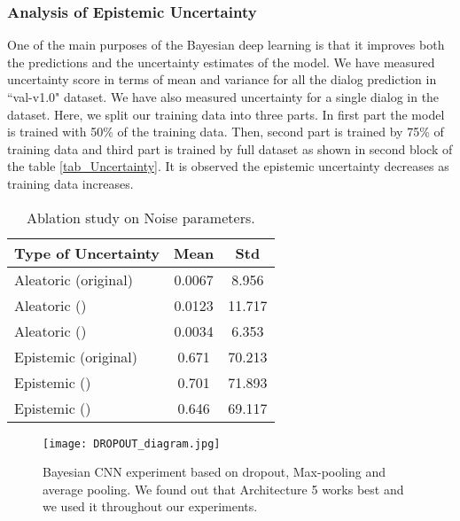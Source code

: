 \documentclass[review]{elsarticle}
\begin{document}
\subsubsection{Analysis of Epistemic Uncertainty }\label{Epistemic_uncertainit}
One of the main purposes of the Bayesian deep learning is that it improves both the predictions and the uncertainty estimates of the model. We have measured uncertainty score in terms of  mean and variance for all the dialog prediction in ``val-v1.0" dataset. We have also measured uncertainty for a single dialog in the dataset. Here, we split our training data into three parts. In first part the model is trained with 50\% of the training data. Then, second part is trained by 75\% of training data and third part is trained by full dataset as shown in second block of the table \ref{tab_Uncertainty}. It is observed the epistemic uncertainty decreases as training data increases. 


\begin{table}[ht]
\centering
\begin{tabular}{|p{3.5cm}|c|c|}
		\hline
		\textbf{Type of Uncertainty}&  \textbf{Mean} & \textbf{Std} \\
		\hline
		Aleatoric (original)      &0.0067  & 8.956\\
		Aleatoric ()      &0.0123  & 11.717\\
		Aleatoric ()      &0.0034  & 6.353\\\hline
		Epistemic (original)      &0.671  & 70.213\\
		Epistemic ()      &0.701  & 71.893\\
		Epistemic ()      &0.646  & 69.117\\\hline
\end{tabular}
\caption{\label{tab_gamma_noise_ALE_EPI} Ablation study on Noise parameters.}
\end{table}

\begin{figure}[ht]
	\centering
	\texttt{[image: DROPOUT\_diagram.jpg]} \vspace{-2.2em}
	\caption{Bayesian CNN experiment based on dropout, Max-pooling and average pooling. We found out that Architecture 5 works best and we used it throughout our experiments. }
	\label{fig:univerise_1}
\end{figure}
\end{document}
